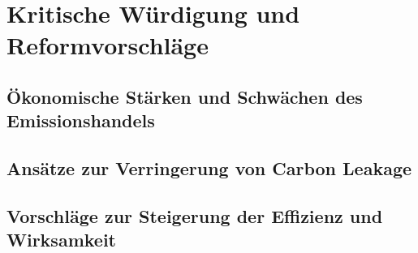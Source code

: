 \chapter{Kritische Würdigung und Reformvorschläge}

\section{Ökonomische Stärken und Schwächen des Emissionshandels}

\section{Ansätze zur Verringerung von Carbon Leakage}

\section{Vorschläge zur Steigerung der Effizienz und Wirksamkeit}






\nocite{*}